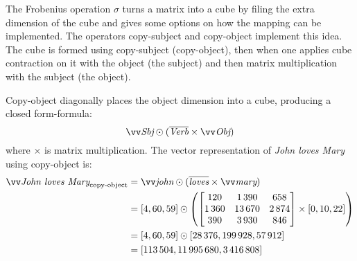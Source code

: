 The Frobenius operation $\sigma$ turns a matrix into a cube by filing the extra dimension of the cube and gives some options on how the mapping can be implemented. The operators copy-subject and copy-object \cite{kartsaklis-sadrzadeh-pulman:2012:POSTERS} implement this idea. The cube is formed using copy-subject (copy-object), then when one applies cube contraction on it with the object (the subject) and then matrix multiplication with the subject (the object).

Copy-object diagonally places the object dimension into a cube, producing a closed form-formula:
%
\begin{equation*}
  \ov{\text{\it Sbj}} \odot (\overline{\text{\it Verb}} \times \ov{\text{\it Obj}})
\end{equation*}
%
where $\times$ is matrix multiplication. The vector representation of \textit{John loves Mary} using copy-object is:
%
\begin{align*}
  \ov{\text{\it John loves Mary}}_{\text{copy-object}} &=\ov{\text{\it john}} \odot (\overline{\text{\it loves}} \times \ov{\text{\it mary}}) \\
                                                       &= [4, 60, 59]%
                                                         \odot \left(%
                                                         \begin{bmatrix}
                                                           120 &  1\,390 &    658 \\
                                                           1\,360 & 13\,670 & 2\,874 \\
                                                           390 &  3\,930 &    846
                                                         \end{bmatrix} %
                                                         \times%
                                                         [0, 10, 22]%
                                                                           \right) \\
                                                       &= [4, 60, 59] \odot [28\,376, 199\,928,  57\,912] \\
                                                       &= [113\,504, 11\,995\,680,  3\,416\,808]
\end{align*}

